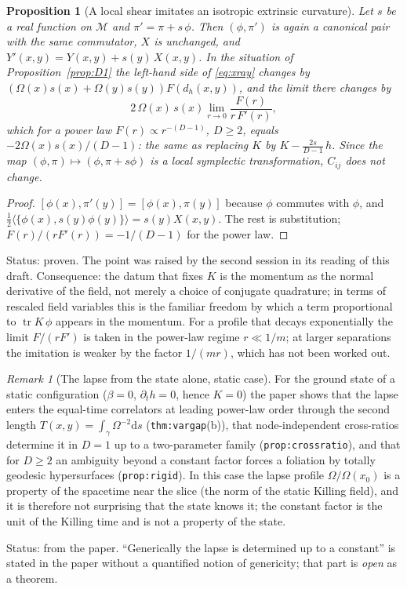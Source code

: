 \documentclass[a4paper,11pt]{article}
\newtheorem{proposition}[theorem]{Proposition}
\theoremstyle{definition}
\theoremstyle{remark}
\newtheorem{remark}[theorem]{Remark}
\DeclareMathOperator{\tr}{tr}
\newcommand{\M}{\mathcal{M}}
\newcommand{\dd}{\mathrm{d}}
\newcommand{\status}[1]{\par\noindent\textsf{\small Status: #1}\par}
\begin{document}
\begin{proposition}[A local shear imitates an isotropic extrinsic curvature]\label{prop:shear}
Let $s$ be a real function on $\M$ and $\pi'=\pi+s\,\phi$. Then $(\phi,\pi')$ is again a canonical pair with the same commutator, $X$ is unchanged, and $Y'(x,y)=Y(x,y)+s(y)\,X(x,y)$. In the situation of Proposition~\ref{prop:D1} the left-hand side of \eqref{eq:xray} changes by $(\Omega(x)s(x)+\Omega(y)s(y))F(d_h(x,y))$, and the limit there changes by
\[
2\,\Omega(x)\,s(x)\lim_{r\to0}\frac{F(r)}{r\,F'(r)} ,
\]
which for a power law $F(r)\propto r^{-(D-1)}$, $D\ge2$, equals $-2\Omega(x)s(x)/(D-1)$: the same as replacing $K$ by $K-\frac{2s}{D-1}\,h$. Since the map $(\phi,\pi)\mapsto(\phi,\pi+s\phi)$ is a local symplectic transformation, $C_{ij}$ does not change.
\end{proposition}

\begin{proof}
$[\phi(x),\pi'(y)]=[\phi(x),\pi(y)]$ because $\phi$ commutes with $\phi$, and $\tfrac12\langle\{\phi(x),s(y)\phi(y)\}\rangle=s(y)X(x,y)$. The rest is substitution; $F(r)/(rF'(r))=-1/(D-1)$ for the power law.
\end{proof}
\status{proven. The point was raised by the second session in its reading of this draft. Consequence: the datum that fixes $K$ is the momentum as the normal derivative of the field, not merely a choice of conjugate quadrature; in terms of rescaled field variables this is the familiar freedom by which a term proportional to $\tr K\,\phi$ appears in the momentum. For a profile that decays exponentially the limit $F/(rF')$ is taken in the power-law regime $r\ll1/m$; at larger separations the imitation is weaker by the factor $1/(mr)$, which has not been worked out.}

\begin{remark}[The lapse from the state alone, static case]\label{rem:static}
For the ground state of a static configuration ($\beta=0$, $\partial_th=0$, hence $K=0$) the paper shows that the lapse enters the equal-time correlators at leading power-law order through the second length $T(x,y)=\int_\gamma\Omega^{-2}\dd s$ (\texttt{thm:vargap}(b)), that node-independent cross-ratios determine it in $D=1$ up to a two-parameter family (\texttt{prop:crossratio}), and that for $D\ge2$ an ambiguity beyond a constant factor forces a foliation by totally geodesic hypersurfaces (\texttt{prop:rigid}). In this case the lapse profile $\Omega/\Omega(x_0)$ is a property of the spacetime near the slice (the norm of the static Killing field), and it is therefore not surprising that the state knows it; the constant factor is the unit of the Killing time and is not a property of the state.
\end{remark}
\status{from the paper. ``Generically the lapse is determined up to a constant'' is stated in the paper without a quantified notion of genericity; that part is \emph{open} as a theorem.}
\end{document}
